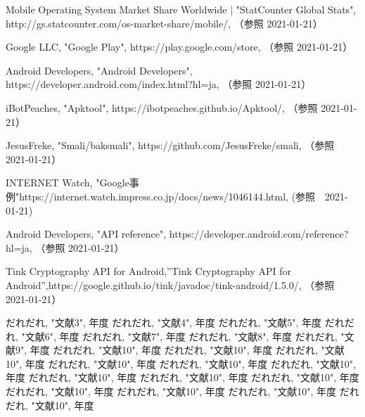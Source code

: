 \newpage
\begin{thebibliography}{99}

Mobile Operating System Market Share Worldwide |  "StatCounter Global Stats",
http://gs.statcounter.com/os-market-share/mobile/, （参照 2021-01-21）

Google LLC, "Google Play", https://play.google.com/store, （参照 2021-01-21）

Android Developers, "Android Developers", https://developer.android.com/index.html?hl=ja, （参照 2021-01-21）

iBotPeaches, "Apktool", https://ibotpeaches.github.io/Apktool/, （参照 2021-01-21）

JesusFreke, "Smali/baksmali", https://github.com/JesusFreke/smali, （参照 2021-01-21）


INTERNET Watch, "Google事例"https://internet.watch.impress.co.jp/docs/news/1046144.html, (参照　2021-01-21)

Android Developers, "API reference", https://developer.android.com/reference?hl=ja, （参照 2021-01-21）

Tink Cryptography API for Android,''Tink Cryptography API for Android'',https://google.github.io/tink/javadoc/tink-android/1.5.0/, （参照 2021-01-21）

だれだれ, "文献3", 年度
だれだれ, "文献4", 年度
だれだれ, "文献5", 年度
だれだれ, "文献6", 年度
だれだれ, "文献7", 年度
だれだれ, "文献8", 年度
だれだれ, "文献9", 年度
だれだれ, "文献10", 年度
だれだれ, "文献10", 年度
だれだれ, "文献10", 年度
だれだれ, "文献10", 年度
だれだれ, "文献10", 年度
だれだれ, "文献10", 年度
だれだれ, "文献10", 年度
だれだれ, "文献10", 年度
だれだれ, "文献10", 年度
だれだれ, "文献10", 年度
だれだれ, "文献10", 年度
だれだれ, "文献10", 年度
だれだれ, "文献10", 年度

\end{thebibliography}